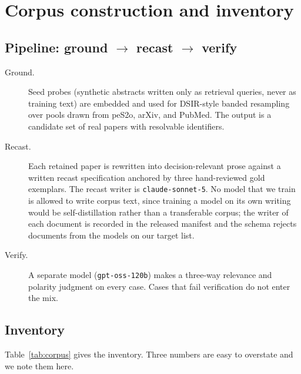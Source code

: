\section{Corpus construction and inventory}
\label{app:corpus}

\subsection{Pipeline: ground \texorpdfstring{$\to$}{->} recast \texorpdfstring{$\to$}{->} verify}
\label{sec:pipeline}

\begin{description}
  \item[Ground.] Seed probes (synthetic abstracts written only as retrieval queries, never as
  training text) are embedded and used for DSIR-style banded resampling over pools drawn from peS2o,
  arXiv, and PubMed. The output is a candidate set of real papers with resolvable identifiers.
  \item[Recast.] Each retained paper is rewritten into decision-relevant prose against a written
  recast specification anchored by three hand-reviewed gold exemplars. The recast writer is
  \texttt{claude-sonnet-5}. No model that we train is allowed to write corpus text, since training
  a model on its own writing would be self-distillation rather than a transferable corpus; the
  writer of each document is recorded in the released manifest and the schema rejects documents
  from the models on our target list.
  \item[Verify.] A separate model (\texttt{gpt-oss-120b}) makes a three-way relevance and polarity
  judgment on every case. Cases that fail verification do not enter the mix.
\end{description}

\subsection{Inventory}
\label{sec:corpus-stats}

Table~\ref{tab:corpus} gives the inventory. Three numbers are easy to overstate and we note them
here.

